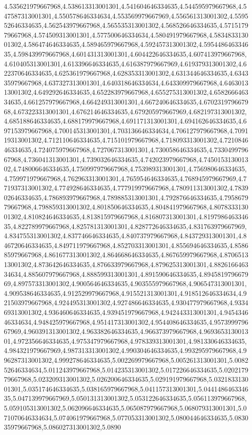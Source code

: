 4.535621979667968,4.538613313001301,4.541604646334635,4.544595979667968,4.547587313001301,4.550578646334634,4.553569979667969,4.556561313001302,4.559552646334635,4.562543979667968,4.565535313001302,4.568526646334635,4.571517979667968,4.574509313001301,4.577500646334634,4.580491979667968,4.583483313001302,4.586474646334635,4.589465979667968,4.592457313001302,4.595448646334635,4.598439979667968,4.601431313001301,4.604422646334635,4.607413979667968,4.610405313001301,4.613396646334635,4.616387979667969,4.619379313001302,4.622370646334635,4.625361979667968,4.628353313001302,4.631344646334635,4.634335979667968,4.637327313001301,4.640318646334634,4.643309979667968,4.646301313001302,4.649292646334635,4.652283979667968,4.655275313001302,4.658266646334635,4.661257979667968,4.664249313001301,4.667240646334635,4.670231979667968,4.673223313001301,4.676214646334635,4.679205979667969,4.682197313001302,4.685188646334635,4.688179979667968,4.691171313001301,4.694162646334635,4.697153979667968,4.700145313001301,4.703136646334634,4.706127979667968,4.709119313001302,4.712110646334635,4.715101979667968,4.718093313001302,4.721084646334635,4.724075979667968,4.727067313001301,4.730058646334635,4.733049979667968,4.736041313001301,4.739032646334635,4.742023979667968,4.745015313001302,4.748006646334635,4.750997979667968,4.753989313001301,4.756980646334635,4.759971979667968,4.762963313001301,4.765954646334635,4.768945979667969,4.771937313001302,4.774928646334635,4.777919979667968,4.780911313001302,4.783902646334635,4.786893979667968,4.789885313001301,4.792876646334635,4.795867979667968,4.798859313001302,4.801850646334635,4.804841979667968,4.807833313001302,4.810824646334635,4.813815979667968,4.816807313001301,4.819798646334635,4.822789979667968,4.825781313001301,4.828772646334635,4.831763979667969,4.834755313001302,4.837746646334635,4.840737979667968,4.843729313001301,4.846720646334635,4.849711979667968,4.852703313001301,4.855694646334635,4.858685979667968,4.861677313001302,4.864668646334635,4.867659979667968,4.870651313001302,4.873642646334635,4.876633979667968,4.879625313001301,4.882616646334634,4.885607979667968,4.888599313001301,4.891590646334635,4.894581979667969,4.897573313001302,4.900564646334635,4.903555979667968,4.906547313001301,4.909538646334635,4.912529979667968,4.915521313001301,4.918512646334634,4.921503979667968,4.924495313001302,4.927486646334635,4.930477979667968,4.933469313001302,4.936460646334635,4.939451979667968,4.942443313001301,4.945434646334634,4.948425979667968,4.951417313001302,4.954408646334635,4.957399979667969,4.960391313001302,4.963382646334635,4.966373979667968,4.969365313001301,4.972356646334635,4.975347979667968,4.978339313001301,4.981330646334635,4.984321979667969,4.987313313001302,4.990304646334635,4.993295979667968,4.996287313001302,4.999278646334635,5.002269979667968,5.005261313001301,5.008252646334634,5.011243979667968,5.014235313001302,5.017226646334635,5.020217979667968,5.023209313001302,5.026200646334635,5.029191979667968,5.032183313001301,5.035174646334635,5.038165979667968,5.041157313001301,5.044148646334635,5.047139979667969,5.050131313001302,5.053122646334635,5.056113979667968,5.059105313001302,5.062096646334635,5.065087979667968,5.068079313001301,5.071070646334634,5.074061979667968,5.077053313001302,5.080044646334635,5.083035979667968,5.086027313001302,5.0890